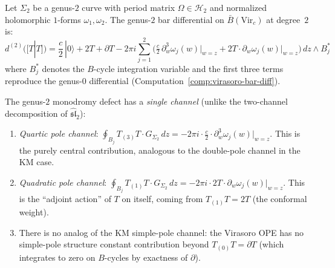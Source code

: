 \begin{theorem}\label{thm:virasoro-genus2-bar}
Let $\Sigma_2$ be a genus-$2$ curve with period matrix
$\Omega \in \mathcal{H}_2$ and normalized holomorphic
$1$-forms $\omega_1, \omega_2$. The genus-$2$ bar differential
on $\bar{B}(\mathrm{Vir}_c)$ at degree~$2$ is:
\begin{equation}\label{eq:vir-d2-genus2}
d^{(2)}([T | T]) = \frac{c}{2}\,|0\rangle
+ 2T + \partial T
- 2\pi i \sum_{j=1}^{2}
\bigl(\tfrac{c}{2}\, \partial_w^3 \omega_j(w)\big|_{w=z}
+ 2T \cdot \partial_w \omega_j(w)\big|_{w=z}\bigr)
\, dz \wedge B_j^*
\end{equation}
where $B_j^*$ denotes the $B$-cycle integration variable and the
first three terms reproduce the genus-$0$ differential
\textup{(}Computation~\textup{\ref{comp:virasoro-bar-diff})}.

The genus-$2$ monodromy defect has a \emph{single channel}
\textup{(}unlike the two-channel decomposition of
$\widehat{\mathfrak{sl}}_2$\textup{)}:
\begin{enumerate}[label=\textup{(\roman*)}]
\item \emph{Quartic pole channel}:
 $\oint_{B_j} T_{(3)} T \cdot G_{\Sigma_2} \,dz
 = -2\pi i \cdot \frac{c}{2} \cdot
 \partial_w^3 \omega_j(w)\big|_{w=z}$.
 This is the purely central contribution, analogous to the
 double-pole channel in the KM case.
\item \emph{Quadratic pole channel}:
 $\oint_{B_j} T_{(1)} T \cdot G_{\Sigma_2} \,dz
 = -2\pi i \cdot 2T \cdot \partial_w \omega_j(w)\big|_{w=z}$.
 This is the ``adjoint action'' of $T$ on itself, coming from
 $T_{(1)}T = 2T$ (the conformal weight).
\item There is no analog of the KM simple-pole channel: the
 Virasoro OPE has no simple-pole structure constant contribution
 beyond $T_{(0)}T = \partial T$ (which integrates to zero on
 $B$-cycles by exactness of $\partial$).
\end{enumerate}
\end{theorem}


